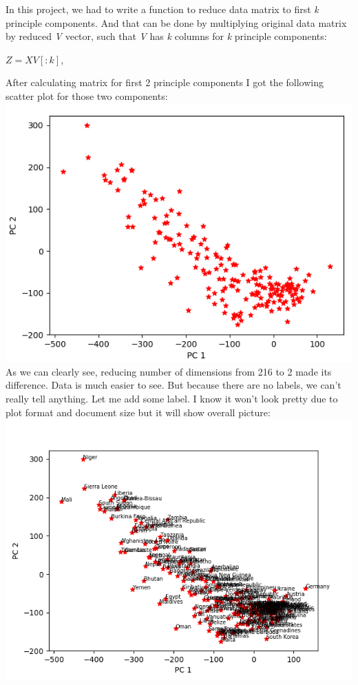 \documentclass[12pt, letterpaper]{article}
\begin{document}
\begin{enumerate}[label=\Roman*.]
	In this project, we had to write a function to reduce data matrix to first {\it k} principle components. And that can be done by multiplying original data matrix by reduced {\it V} vector, such that {\it V} has {\it k} columns for {\it k} principle components:\\
	 \begin{center} \(Z = X V[:k]\), \end{center}
	 After calculating matrix for first 2 principle components I got the following scatter plot for those two components:\\
	\includegraphics[scale=1]{scatter_pcs1.png} \\
	
	As we can clearly see, reducing number of dimensions from 216 to 2 made its difference. Data is much easier to see. But because there are no labels, we can't really tell anything. Let me add some label. I know it won't look pretty due to plot format and document size but it will show overall picture:\\
	\includegraphics[scale=1.0]{scatter_pcs.png} \\
	

\end{enumerate}
\end{document}
